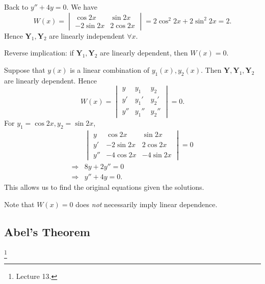 \documentclass[a4paper]{article}
\begin{document}
    \begin{example}
        Back to $ y''+4y=0 $. We have 
        \[
            W(x)=\begin{vmatrix}
                \cos 2x& \sin 2x\\
                -2 \sin 2x& 2 \cos 2x
            \end{vmatrix}=2 \cos^2 2x+ 2 \sin^2 2x=2
        .\]
        Hence $ \mathbf{Y}_1,\mathbf{Y}_2 $ are linearly independent $ \forall x $.
    \end{example}
    \begin{remark}
        Reverse implication: if $ \mathbf{Y}_1,  \mathbf{Y}_2 $ are linearly dependent, then $ W(x)=0 $.

        Suppose that $ y(x) $ is a linear combination of $y_1(x),y_2(x)$. Then $\mathbf{Y}, \mathbf{Y}_1, \mathbf{Y}_2 $ are linearly dependent. Hence 
        \[
            W(x)=\begin{vmatrix}
                y&y_1&y_2\\
                y'&y_1'&y_2'\\
                y''&y_1''&y_2''
            \end{vmatrix}=0
        .\]
        For $ y_1= \cos 2x, y_2=\sin 2x $,
        \[
            \begin{aligned}
                &\begin{vmatrix}
                    y&\cos 2x&\sin 2x\\
                    y'&-2 \sin 2x&2 \cos 2x\\
                    y''&-4 \cos 2x&-4 \sin 2x
                \end{vmatrix}=0\\
                \Longrightarrow & 8y+2y''=0\\
                \Longrightarrow & y''+4y=0.
            \end{aligned}
        \]
        This allows us to find the original equations given the solutions.
    \end{remark}
    \begin{remark}
        Note that $W(x)=0$ does \textit{not} necessarily imply linear dependence.
    \end{remark}
    \subsection{Abel's Theorem}\footnote{Lecture 13.}
\end{document}
